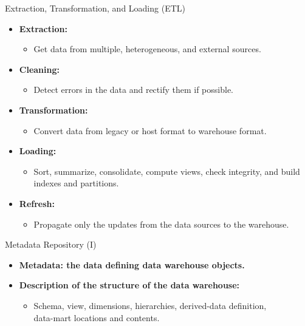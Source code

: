 \begin{frame}{Extraction, Transformation, and Loading (ETL)}
	\begin{itemize}
		\item \textbf{\color{airforceblue}Extraction:}
		      \begin{itemize}
			      \item Get data from multiple, heterogeneous, and external sources.
		      \end{itemize}
		\item \textbf{\color{airforceblue}Cleaning:}
		      \begin{itemize}
			      \item Detect errors in the data and rectify them if possible.
		      \end{itemize}
		\item \textbf{\color{airforceblue}Transformation:}
		      \begin{itemize}
			      \item Convert data from legacy or host format to warehouse format.
		      \end{itemize}
		\item \textbf{\color{airforceblue}Loading:}
		      \begin{itemize}
			      \item Sort, summarize, consolidate, compute views, check integrity, and build indexes and partitions.
		      \end{itemize}
		\item \textbf{\color{airforceblue}Refresh:}
		      \begin{itemize}
			      \item Propagate only the updates from the data sources to the warehouse.
		      \end{itemize}
	\end{itemize}
\end{frame}

\begin{frame}{Metadata Repository (I)}
	\begin{itemize}
		\item \textbf{Metadata: the data defining data warehouse objects.}
		\item \textbf{Description of the {\color{airforceblue}structure} of the data warehouse:}
		      \begin{itemize}
			      \item Schema, view, dimensions, hierarchies, derived-data definition, \\
			            data-mart locations and contents.
		      \end{itemize}

	\end{itemize}
\end{frame}

